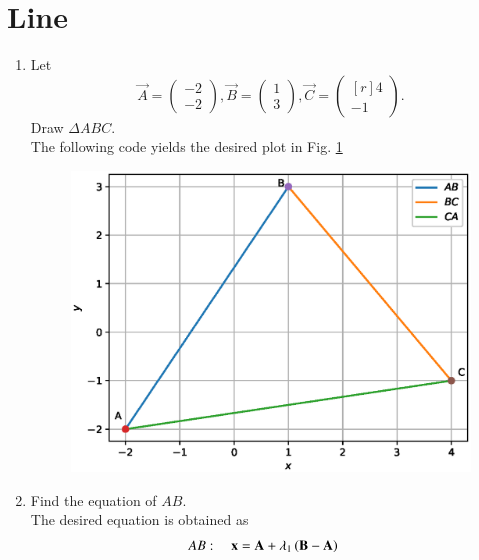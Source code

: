 \documentclass[journal,12pt,twocolumn]{IEEEtran}
\renewcommand\thesection{\arabic{section}}
\begin{document}
\section{Line}
\begin{enumerate}[label=\thesection.\arabic*
,ref=\thesection.\theenumi]
\item
\label{prob:draw_triangle}
Let
\begin{equation}
\vec{A} =
\begin{pmatrix}
-2
\\
-2
\end{pmatrix},
\vec{B} =
\begin{pmatrix}
1
\\
3
\end{pmatrix},
\vec{C} =
\begin{pmatrix*}[r]
4
\\
-1
\end{pmatrix*}.
\end{equation}
Draw $\Delta ABC$.
\\
\solution
The following code yields the desired plot in Fig. \ref{fig:triangle_def}

\begin{figure}
\centering
\includegraphics[width=\columnwidth]{./figs/triangle.eps}
\caption{}
\label{fig:triangle_def}
\end{figure}
%
\item
%
Find the equation of $AB$.
\\
\solution  The desired equation is obtained as
\begin{align}
\label{eq:line_dir}
AB: \quad \vec{x} &= \vec{A}+ \lambda_1 \brak{\vec{B}-\vec{A}}

\end{align}
\end{enumerate}
\end{document}
